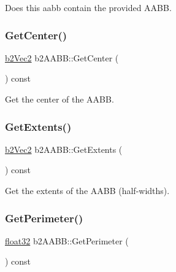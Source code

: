 Does this aabb contain the provided A\+A\+BB. 

\mbox{\label{structb2_a_a_b_b_a2c4051e79001a3166cc7f8ad811137fe}} 
\subsubsection{\texorpdfstring{GetCenter()}{GetCenter()}}
{\footnotesize\ttfamily \mbox{\hyperlink{structb2_vec2}{b2\+Vec2}} b2\+A\+A\+B\+B\+::\+Get\+Center (\begin{DoxyParamCaption}{ }\end{DoxyParamCaption}) const\hspace{0.3cm}{\ttfamily [inline]}}



Get the center of the A\+A\+BB. 

\mbox{\label{structb2_a_a_b_b_a2a4f550a18d2a0895fbc5c4d3ec17d22}} 
\subsubsection{\texorpdfstring{GetExtents()}{GetExtents()}}
{\footnotesize\ttfamily \mbox{\hyperlink{structb2_vec2}{b2\+Vec2}} b2\+A\+A\+B\+B\+::\+Get\+Extents (\begin{DoxyParamCaption}{ }\end{DoxyParamCaption}) const\hspace{0.3cm}{\ttfamily [inline]}}



Get the extents of the A\+A\+BB (half-\/widths). 

\mbox{\label{structb2_a_a_b_b_a25d2504d2f2fdec88f9347f62f112268}} 
\subsubsection{\texorpdfstring{GetPerimeter()}{GetPerimeter()}}
{\footnotesize\ttfamily \mbox{\hyperlink{b2_settings_8h_aacdc525d6f7bddb3ae95d5c311bd06a1}{float32}} b2\+A\+A\+B\+B\+::\+Get\+Perimeter (\begin{DoxyParamCaption}{ }\end{DoxyParamCaption}) const\hspace{0.3cm}{\ttfamily [inline]}}



